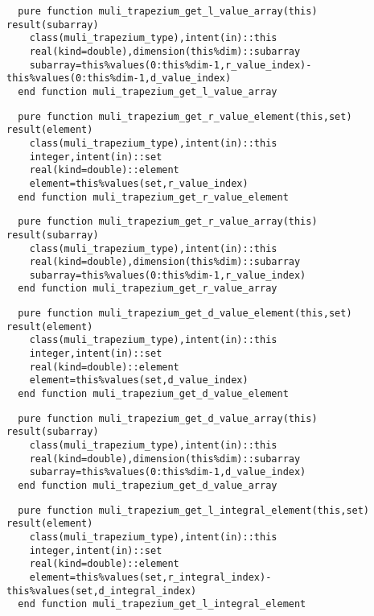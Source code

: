 \begin{Verbatim}
  pure function muli_trapezium_get_l_value_array(this) result(subarray)
    class(muli_trapezium_type),intent(in)::this
    real(kind=double),dimension(this%dim)::subarray
    subarray=this%values(0:this%dim-1,r_value_index)-this%values(0:this%dim-1,d_value_index)
  end function muli_trapezium_get_l_value_array
\end{Verbatim}

\begin{Verbatim}
  pure function muli_trapezium_get_r_value_element(this,set) result(element)
    class(muli_trapezium_type),intent(in)::this
    integer,intent(in)::set
    real(kind=double)::element
    element=this%values(set,r_value_index)
  end function muli_trapezium_get_r_value_element
\end{Verbatim}

\begin{Verbatim}
  pure function muli_trapezium_get_r_value_array(this) result(subarray)
    class(muli_trapezium_type),intent(in)::this
    real(kind=double),dimension(this%dim)::subarray
    subarray=this%values(0:this%dim-1,r_value_index)
  end function muli_trapezium_get_r_value_array
\end{Verbatim}

\begin{Verbatim}
  pure function muli_trapezium_get_d_value_element(this,set) result(element)
    class(muli_trapezium_type),intent(in)::this
    integer,intent(in)::set
    real(kind=double)::element
    element=this%values(set,d_value_index)
  end function muli_trapezium_get_d_value_element
\end{Verbatim}

\begin{Verbatim}
  pure function muli_trapezium_get_d_value_array(this) result(subarray)
    class(muli_trapezium_type),intent(in)::this
    real(kind=double),dimension(this%dim)::subarray
    subarray=this%values(0:this%dim-1,d_value_index)
  end function muli_trapezium_get_d_value_array
\end{Verbatim}

\begin{Verbatim}
  pure function muli_trapezium_get_l_integral_element(this,set) result(element)
    class(muli_trapezium_type),intent(in)::this
    integer,intent(in)::set
    real(kind=double)::element
    element=this%values(set,r_integral_index)-this%values(set,d_integral_index)
  end function muli_trapezium_get_l_integral_element
\end{Verbatim}

